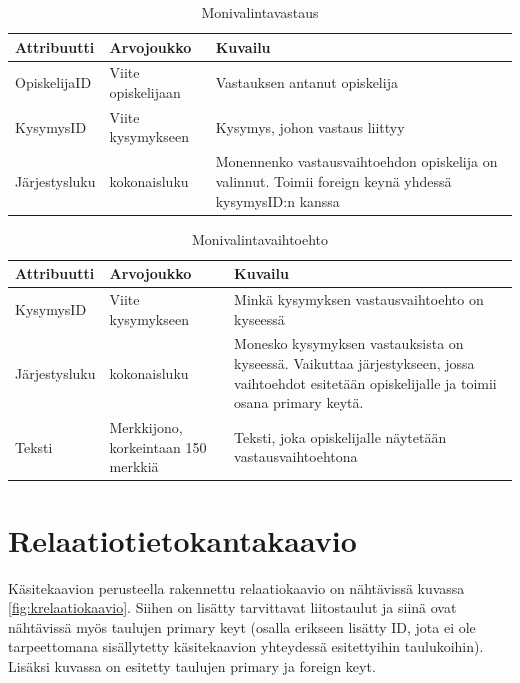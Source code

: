 \documentclass[12pt,a4paper,titlepage]{article}
\begin{document}
\begin{table}[h]
\caption{Monivalintavastaus}
\begin{tabularx}{\textwidth}{ |  l X X  |}
  \hline
  Attribuutti & Arvojoukko & Kuvailu \\
  \hline
  OpiskelijaID & Viite opiskelijaan & Vastauksen antanut opiskelija \\
  KysymysID & Viite kysymykseen & Kysymys, johon vastaus liittyy \\
  Järjestysluku & kokonaisluku & Monennenko vastausvaihtoehdon opiskelija on valinnut. Toimii foreign keynä yhdessä kysymysID:n kanssa \\
  \hline
\end{tabularx}
\end{table}

\begin{table}[h]
\caption{Monivalintavaihtoehto} \label{tietokohde_viimeinen}
\begin{tabularx}{\textwidth}{ |  l X X  |}
  \hline
  Attribuutti & Arvojoukko & Kuvailu \\
  \hline
  KysymysID & Viite kysymykseen & Minkä kysymyksen vastausvaihtoehto on kyseessä \\
  Järjestysluku & kokonaisluku & Monesko kysymyksen vastauksista on kyseessä. Vaikuttaa järjestykseen, jossa vaihtoehdot esitetään opiskelijalle ja toimii osana primary keytä. \\
  Teksti & Merkkijono, korkeintaan 150 merkkiä & Teksti, joka opiskelijalle näytetään vastausvaihtoehtona \\
  \hline
\end{tabularx}
\end{table}


\section{Relaatiotietokantakaavio}
Käsitekaavion perusteella rakennettu relaatiokaavio on nähtävissä kuvassa \ref{fig:krelaatiokaavio}. Siihen on lisätty tarvittavat liitostaulut ja siinä ovat nähtävissä myös taulujen primary keyt (osalla erikseen lisätty ID, jota ei ole tarpeettomana sisällytetty käsitekaavion yhteydessä esitettyihin taulukoihin). Lisäksi kuvassa on esitetty taulujen primary ja foreign keyt.
\end{document}
